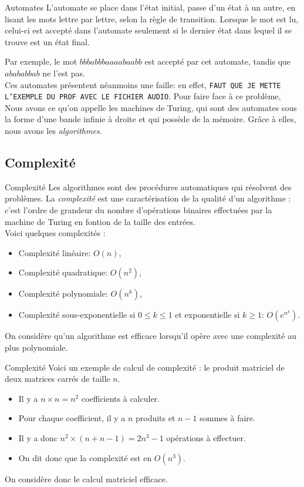 \documentclass[utf8,10pt,french]{beamer}
\newcommand{\com}[1]{\texttt{\color{red}#1}}
\newcommand{\var}[1]{\textit{\color{green!50!black}#1}}
\begin{document}
\begin{frame}{Automates}
L'automate se place dans l'état initial, passe d'un état à un autre, en lisant les mots lettre par lettre, selon la règle de transition. Lorsque le mot est lu, celui-ci est accepté dans l'automate seulement si le dernier état dans lequel il se trouve est un état final. \\
\begin{center}
\end{center}
Par exemple, le mot $bbbabbbaaaabaabb$ est accepté par cet automate, tandis que $abababbab$ ne l'est pas.\\
Ces automates présentent néanmoins une faille: en effet, \com{FAUT QUE JE METTE L'EXEMPLE DU PROF AVEC LE FICHIER AUDIO}. Pour faire face à ce problème, Nous avons ce qu'on appelle les machines de Turing, qui sont des automates sous la forme d'une bande infinie à droite et qui possède de la mémoire. Grâce à elles, nous avons les \var{algorithmes}. 
\end{frame}

\subsection{Complexité}
\begin{frame}{Complexité}
Les algorithmes sont des procédures automatiques qui résolvent des problèmes. La \var{complexité} est une caractérisation de la qualité d'un algorithme : c'est l'ordre de grandeur du nombre d'opérations binaires effectuées par la machine de Turing en fontion de la taille des entrées.\\
Voici quelques complexités : 
\begin{itemize}
\item Complexité linéaire: \com{$O(n)$},
\item Complexité quadratique: \com{$O(n^2)$},
\item Complexité polynomiale: \com{$O(n^k)$},
\item Complexité sous-exponentielle si $0 \leq k \leq 1$ et exponentielle si $k \ge 1$: \com{$O(e^{n^k})$}. 
\end{itemize}
On considère qu'un algorithme est efficace lorsqu'il opère avec une complexité au plus polynomiale.
\end{frame}

\begin{frame}{Complexité}
Voici un exemple de calcul de complexité : le produit matriciel de deux matrices carrés de taille $n$.
\begin{itemize}
\item Il y a $n \times n = n^2$ coefficients à calculer.\pause
\item Pour chaque coefficient, il y a $n$ produits et $n-1$ sommes à faire.\pause
\item Il y a donc $n^2 \times (n + n - 1) = 2n^3 - 1$ opérations à effectuer.\pause
\item On dit donc que la complexité est en $O(n^3)$.
\end{itemize}
On considère donc le calcul matriciel efficace.
\end{frame}
\end{document}
